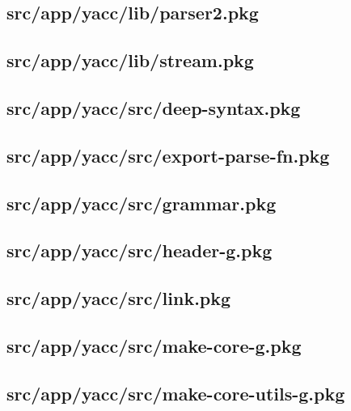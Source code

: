 \subsection{src/app/yacc/lib/parser2.pkg}


\subsection{src/app/yacc/lib/stream.pkg}


\subsection{src/app/yacc/src/deep-syntax.pkg}


\subsection{src/app/yacc/src/export-parse-fn.pkg}


\subsection{src/app/yacc/src/grammar.pkg}


\subsection{src/app/yacc/src/header-g.pkg}


\subsection{src/app/yacc/src/link.pkg}


\subsection{src/app/yacc/src/make-core-g.pkg}


\subsection{src/app/yacc/src/make-core-utils-g.pkg}


